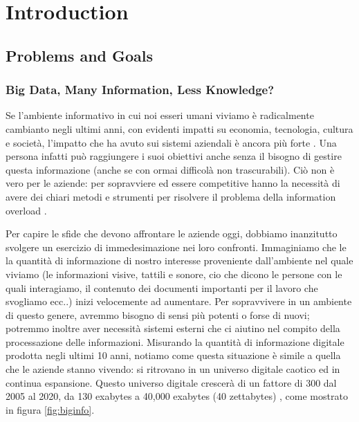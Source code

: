 \documentclass[]{book}
\title{}
\author{}
\date{}
\begin{document}
{
\setcounter{tocdepth}{1}
\tableofcontents
}
\part{Introduction}\label{part-introduction}

\chapter{Problems and Goals}\label{introproblems}

\section{Big Data, Many Information, Less
Knowledge?}\label{big-data-many-information-less-knowledge}

Se l'ambiente informativo in cui noi esseri umani viviamo è radicalmente
cambianto negli ultimi anni, con evidenti impatti su economia,
tecnologia, cultura e società, l'impatto che ha avuto sui sistemi
aziendali è ancora più forte
\citep{Arun2006Firm, jin2015significance, degryse2016digitalisation, john2014big, o2016weapons}.
Una persona infatti può raggiungere i suoi obiettivi anche senza il
bisogno di gestire questa informazione (anche se con ormai difficolà non
trascurabili). Ciò non è vero per le aziende: per sopravviere ed essere
competitive hanno la necessità di avere dei chiari metodi e strumenti
per risolvere il problema della information overload
\citep{levitin2014organized, feng2015competing}.

Per capire le sfide che devono affrontare le aziende oggi, dobbiamo
inanzitutto svolgere un esercizio di immedesimazione nei loro confronti.
Immaginiamo che le la quantità di informazione di nostro interesse
proveniente dall'ambiente nel quale viviamo (le informazioni visive,
tattili e sonore, cio che dicono le persone con le quali interagiamo, il
contenuto dei documenti importanti per il lavoro che svogliamo ecc..)
inizi velocemente ad aumentare. Per sopravvivere in un ambiente di
questo genere, avremmo bisogno di sensi più potenti o forse di nuovi;
potremmo inoltre aver necessità sistemi esterni che ci aiutino nel
compito della processazione delle informazioni. Misurando la quantità di
informazione digitale prodotta negli ultimi 10 anni, notiamo come questa
situazione è simile a quella che le aziende stanno vivendo: si ritrovano
in un universo digitale caotico ed in continua espansione. Questo
universo digitale crescerà di un fattore di 300 dal 2005 al 2020, da 130
exabytes a 40,000 exabytes (40 zettabytes) \citep{gantz2012digital},
come mostrato in figura \ref{fig:biginfo}.
\end{document}
